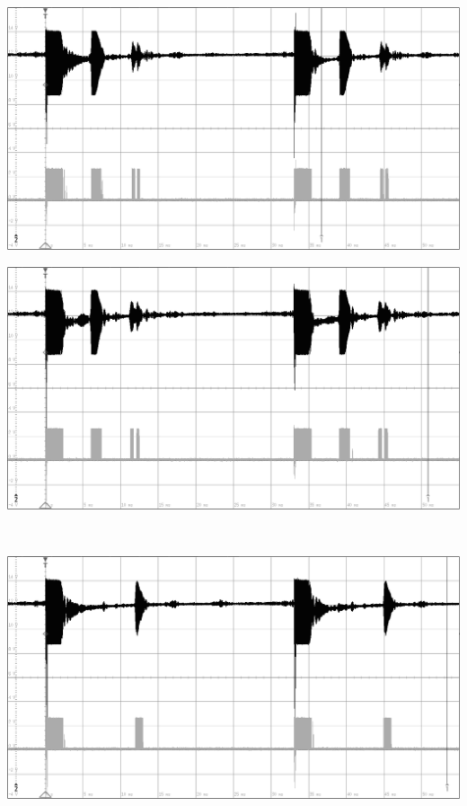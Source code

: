 \begin{minipage}{0.46\textwidth}
\includegraphics[width=1\textwidth%
]{Abbildungen/MessungenP2/15V/1m.PNG}
\end{minipage}\qquad
\begin{minipage}{0.46\textwidth}
\includegraphics[width=1\textwidth%
]{Abbildungen/MessungenP2/20V/1m.PNG}
\end{minipage}\\
\begin{minipage}{0.46\textwidth}
\includegraphics[width=1\textwidth%
]{Abbildungen/MessungenP2/15V/2m.PNG}
\end{minipage}\qquad

